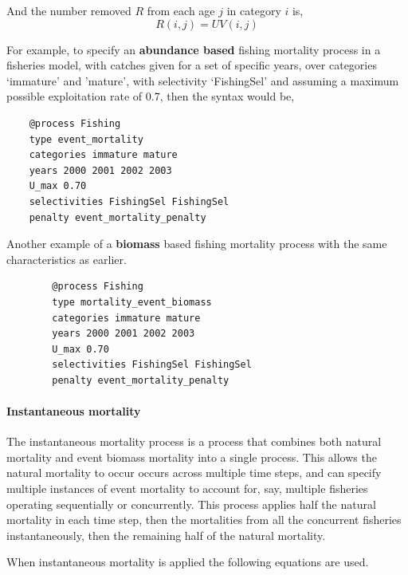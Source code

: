 And the number removed $R$ from each age $j$ in category $i$ is,
\begin{equation}
  R(i,j) = UV(i,j)
\end{equation}

For example, to specify an \textbf{abundance based} fishing mortality process in a fisheries model, with catches given for a set of specific years, over categories `immature' and 'mature', with selectivity `FishingSel' and assuming a maximum possible exploitation rate of 0.7, then the syntax would be,

{\small{\begin{verbatim}
	@process Fishing
	type event_mortality
	categories immature mature
	years 2000 2001 2002 2003
	U_max 0.70
	selectivities FishingSel FishingSel
	penalty event_mortality_penalty
	\end{verbatim}}}

Another example of a \textbf{biomass} based fishing mortality process with the same characteristics as earlier.

{\small{\begin{verbatim}
		@process Fishing
		type mortality_event_biomass
		categories immature mature
		years 2000 2001 2002 2003
		U_max 0.70
		selectivities FishingSel FishingSel
		penalty event_mortality_penalty
		\end{verbatim}}}
\paragraph{Instantaneous mortality}

The instantaneous mortality process is a process that combines both natural mortality and event biomass mortality into a single process. This allows the natural mortality to occur occurs across multiple time steps, and can specify multiple instances of event mortality to account for, say, multiple fisheries operating sequentially or concurrently. This process applies half the natural mortality in each time step, then the mortalities from all the concurrent fisheries instantaneously, then the remaining half of the natural mortality.

When instantaneous mortality is applied the following equations are used.

